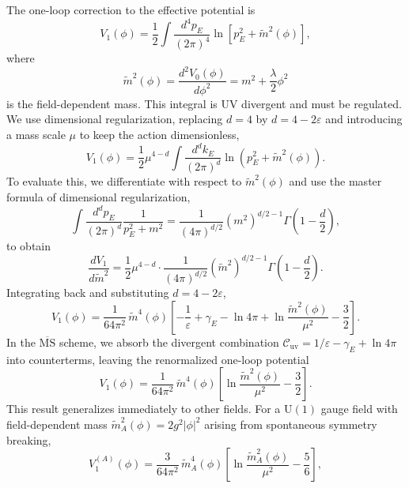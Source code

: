 The one-loop correction to the effective potential is
\begin{equation}
	V_1(\phi) = \frac{1}{2}\int\frac{d^4p_E}{(2\pi)^4}
	\ln\!\left[p_E^2 + \tilde m^2(\phi)\right],
\end{equation}
where
\begin{equation}
	\tilde m^2(\phi) = \frac{d^2 V_0(\phi)}{d\phi^2}
	= m^2 + \frac{\lambda}{2}\phi^2
\end{equation}
is the field-dependent mass. This integral is UV divergent and must be
regulated. We use dimensional regularization, replacing $d=4$ by
$d=4-2\varepsilon$ and introducing a mass scale $\mu$ to keep the
action dimensionless,
\begin{equation}
	V_1(\phi) = \frac{1}{2}\mu^{4-d}
	\int\frac{d^dk_E}{(2\pi)^d}
	\ln\!\left(p_E^2 + \tilde m^2(\phi)\right).
\end{equation}
To evaluate this, we differentiate with respect to $\tilde m^2(\phi)$
and use the master formula of dimensional regularization,
\begin{equation}
	\int\frac{d^dp_E}{(2\pi)^d}
	\frac{1}{p_E^2+m^2}
	= \frac{1}{(4\pi)^{d/2}}(m^2)^{d/2-1}
	\Gamma\!\left(1-\frac{d}{2}\right),
\end{equation}
to obtain
\begin{equation}
	\frac{dV_1}{d\tilde m^2}
	= \frac{1}{2}\mu^{4-d}\cdot
	\frac{1}{(4\pi)^{d/2}}
	\left(\tilde m^2\right)^{d/2-1}
	\Gamma\!\left(1-\frac{d}{2}\right).
\end{equation}
Integrating back and substituting $d=4-2\varepsilon$,
\begin{equation}
	V_1(\phi) = \frac{1}{64\pi^2}\,\tilde m^4(\phi)
	\left[-\frac{1}{\varepsilon} + \gamma_E - \ln 4\pi
		+ \ln\frac{\tilde m^2(\phi)}{\mu^2} - \frac{3}{2}\right].
\end{equation}
In the $\overline{\text{MS}}$ scheme, we absorb the divergent combination
$\mathcal{C}_{\text{uv}} = 1/\varepsilon - \gamma_E + \ln 4\pi$ into
counterterms, leaving the renormalized one-loop potential
\begin{equation}
	\boxed{V_1(\phi) = \frac{1}{64\pi^2}\,\tilde m^4(\phi)
		\left[\ln\frac{\tilde m^2(\phi)}{\mu^2} - \frac{3}{2}\right].}
	\label{eq:CW-msbar}
\end{equation}
This result generalizes immediately to other fields. For a $\mathrm{U}(1)$
gauge field with field-dependent mass $\tilde m_A^2(\phi) = 2g^2|\phi|^2$
arising from spontaneous symmetry breaking,
\begin{equation}
	V_1^{(A)}(\phi) = \frac{3}{64\pi^2}\,\tilde m_A^4(\phi)
	\left[\ln\frac{\tilde m_A^2(\phi)}{\mu^2} - \frac{5}{6}\right],
\end{equation}
